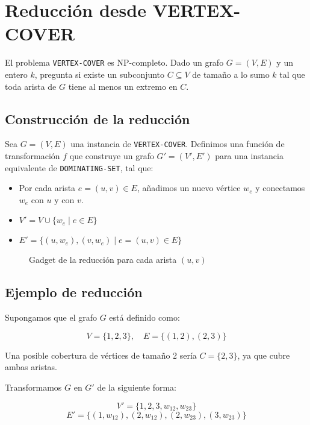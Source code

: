\documentclass[a4paper,12pt]{article}
\begin{document}
\section{Reducción desde VERTEX-COVER}
El problema \texttt{VERTEX-COVER} es NP-completo. Dado un grafo \( G = (V, E) \) y un entero \( k \), pregunta si existe un subconjunto \( C \subseteq V \) de tamaño a lo sumo \( k \) tal que toda arista de \( G \) tiene al menos un extremo en \( C \).

\subsection*{Construcción de la reducción}
Sea \( G = (V, E) \) una instancia de \texttt{VERTEX-COVER}. Definimos una función de transformación \( f \) que construye un grafo \( G' = (V', E') \) para una instancia equivalente de \texttt{DOMINATING-SET}, tal que:
\begin{itemize}
    \item Por cada arista \( e = (u, v) \in E \), añadimos un nuevo vértice \( w_e \) y conectamos \( w_e \) con \( u \) y con \( v \).
    \item \( V' = V \cup \{ w_e \mid e \in E \} \)
    \item \( E' = \{ (u, w_e), (v, w_e) \mid e = (u, v) \in E \} \)
\end{itemize}

\begin{figure}[H]
\centering
{}
\caption{Gadget de la reducción para cada arista \( (u,v) \)}
\end{figure}

\subsection{Ejemplo de reducción}
Supongamos que el grafo \( G \) está definido como:

\[
V = \{1, 2, 3\}, \quad E = \{(1,2), (2,3)\}
\]

Una posible cobertura de vértices de tamaño 2 sería \( C = \{2,3\} \), ya que cubre ambas aristas.

Transformamos \( G \) en \( G' \) de la siguiente forma:

\[
V' = \{1,2,3, w_{12}, w_{23} \}
\]
\[
E' = \{(1, w_{12}), (2, w_{12}), (2, w_{23}), (3, w_{23})\}
\]
\end{document}

